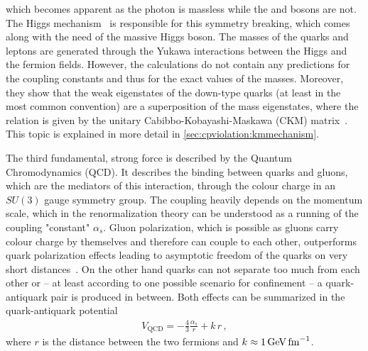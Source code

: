 which becomes apparent as the photon is massless while the \Wpm and \Z bosons
are not. The Higgs mechanism~\cite{Higgs:1964pj} is responsible for this
symmetry breaking, which comes along with the need of the massive Higgs boson.
The masses of the quarks and leptons are generated through the Yukawa
interactions between the Higgs and the fermion fields. However, the
calculations do not contain any predictions for the coupling constants and
thus for the exact values of the masses. Moreover, they show that the weak
eigenstates of the down-type quarks (at least in the most common convention)
are a superposition of the mass eigenstates, where the relation is given by
the unitary Cabibbo-Kobayashi-Maskawa (CKM) matrix~\cite{Kobayashi:1973fv}.
This topic is explained in more detail in \cref{sec:cpviolation:kmmechanism}.


The third fundamental, strong force is described by the Quantum Chromodynamics
(QCD). It describes the binding between quarks and gluons, which are the
mediators of this interaction, through the colour charge in an $SU(3)$ gauge
symmetry group. The coupling heavily depends on the momentum scale, which in
the renormalization theory can be understood as a running of the coupling
"constant" $\alpha_s$. Gluon polarization, which is possible as gluons carry
colour charge by themselves and therefore can couple to each other,
outperforms quark polarization effects leading to asymptotic freedom of the
quarks on very short
distances~\cite{AsymptoticFreedom_GrossWilczek,AsymptoticFreedom_Politzer}. On
the other hand quarks can not separate too much from each other or -- at least
according to one possible scenario for confinement -- a quark-antiquark pair
is produced in between. Both effects can be summarized in the quark-antiquark
potential
\begin{align}
	V_{\mathrm{QCD}} = - \frac 43 \frac{\alpha_s}{r} + k\,r\,,
\end{align}
where $r$ is the distance between the two fermions and $k \approx
\SI{1}{\GeV\fm^{-1}}$.
